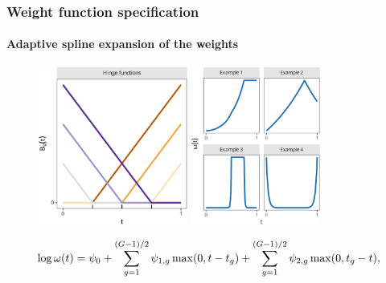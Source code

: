 \documentclass{snedecorbeamer}
\begin{document}
\begin{frame}
  \frametitle{Weight function specification}
  \framesubtitle{Adaptive spline expansion of the weights}

  \begin{figure}
    \centering
    \includegraphics[height=14em]{inc/bew_hinge_basis_fsc070.pdf}
    \includegraphics[height=14em]{inc/bew_hinge_weights_fsc070.pdf}
  \end{figure}
  \begin{equation}
    \tiny
    \log\omega(t)
    \label{eq:hew-log}
    =\psi_{0} + \sum_{g=1}^{(G-1)/2} \psi_{1,g}\max(0, t - t_g)
    + \sum_{g=1}^{(G-1)/2} \psi_{2,g}\max(0, t_g - t),
  \end{equation}

\end{frame}




\end{document}
